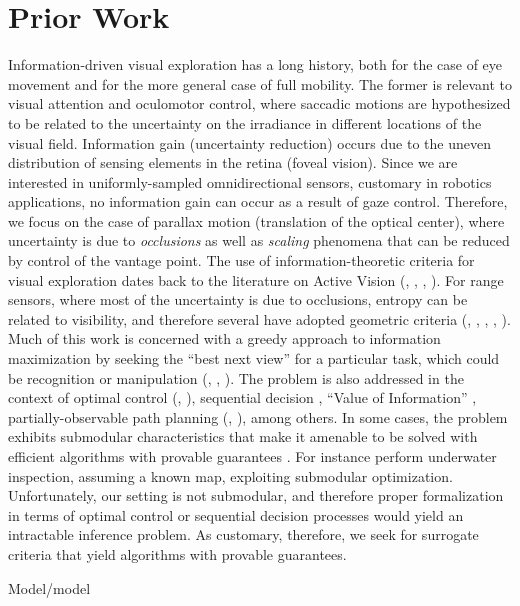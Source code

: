 \section{Prior Work}
Information-driven visual exploration has a long history, both for the case of eye movement and for the more general case of full mobility. The former is relevant to visual attention and oculomotor control, 
where saccadic motions are hypothesized to be related to the uncertainty on the irradiance in different locations of the visual field. Information gain (uncertainty reduction) occurs due to the uneven distribution
of sensing elements in the retina (foveal vision). Since we are interested in uniformly-sampled omnidirectional sensors, customary in robotics applications, no information gain can occur as a result of gaze control. 
Therefore, we focus on the case of parallax motion (translation of the optical center), where uncertainty is due to {\em occlusions} as well as {\em scaling} phenomena that can be reduced by control of the vantage point.
The use of information-theoretic criteria for visual exploration dates back to the literature on Active Vision (\cite{whaiteF97}, \cite{arbelF01}, \cite{yuG00}, \cite{burnsB03}). For range sensors, 
where most of the uncertainty is due to occlusions, entropy can be related to visibility, and therefore several have adopted geometric criteria (\cite{connolly85}, \cite{yuWY96}, \cite{yamauchi97}, \cite{grabowskiKC03}, 
\cite{valenteTS12}). Much of this work is concerned with a greedy approach to information maximization by seeking the ``best next view'' for a particular task, which could be recognition or manipulation (\cite{grabowskiKC03}, 
\cite{denzlerB02}, \cite{royCB04}).
The problem is also addressed in the context of optimal control (\cite{cassandraKL94}, \cite{SimD04}), sequential decision \cite{algoet94}, ``Value of Information'' \cite{dearden99}, 
partially-observable path planning (\cite{hauskrecht00}, \cite{kearnsMN99}), among others. In some cases, the problem exhibits submodular characteristics that make it amenable to be solved with
efficient algorithms with provable guarantees \cite{krauseG07}. For instance \cite{hollinger12} perform underwater inspection, assuming a known map, exploiting submodular optimization. Unfortunately, 
our setting is not submodular, and therefore proper formalization in terms of optimal control or sequential decision processes would yield an intractable inference problem. As customary, therefore, we seek for 
surrogate criteria that yield algorithms with provable guarantees.
% 


{Model/model}
